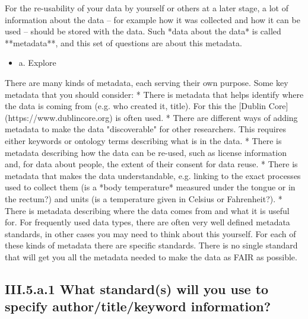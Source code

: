 \documentclass[a4paper,12pt]{report}
\begin{document}
\noindent
\begin{markdown}
For the re-usability of your data by yourself or others at a later stage, a lot of information about the data – for example how it was collected and how it can be used – should be stored with the data. Such *data about the data* is called **metadata**, and this set of questions are about this metadata.
\end{markdown}



\begin{itemize}
  \item[\CheckmarkBold] a. Explore
\end{itemize}

\noindent
\begin{markdown}
There are many kinds of metadata, each serving their own purpose.  Some key metadata that you should consider:
* There is metadata that helps identify where the data is coming from (e.g. who created it, title). For this the [Dublin Core](https://www.dublincore.org) is often used.
* There are different ways of adding metadata to make the data "discoverable" for other researchers. This requires either keywords or ontology terms describing what is in the data.
* There is metadata describing how the data can be re-used, such as license information and, for data about people, the extent of their consent for data reuse.
* There is metadata that makes the data understandable, e.g. linking to the exact processes used to collect them (is a *body temperature* measured under the tongue or in the rectum?) and units (is a temperature given in Celsius or Fahrenheit?). 
* There is metadata describing where the data comes from and what it is useful for. For frequently used data types, there are often very well defined metadata standards, in other cases you may need to think about this yourself.
For each of these kinds of metadata there are specific standards. There is no single standard that will get you all the metadata needed to make the data as FAIR as possible.

\end{markdown}


\subsection*{\protect\textcolor{colorSecId}{III.5.a.1} What standard(s) will you use to specify author/title/keyword information?}

\label{b1df3c74-0b1f-4574-81c4-4cc2d780c1af.8c962e6f-17ee-4b22-8ebb-9f06f779e3b3.6d18bfff-0f53-469b-934e-9806dda9d4fb.1440afd6-d516-44f6-9c02-6abb13900b66}
\end{document}
